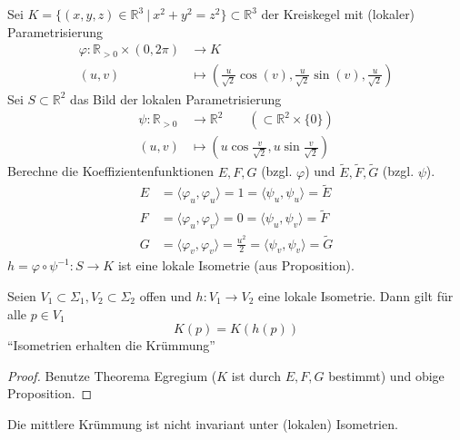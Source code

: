 \documentclass[../main.tex]{subfiles}
\begin{document}
\begin{example}[Kreiskegel]
    Sei $K=\{(x,y,z)\in \mathbb{R}^3 \ | \ x^2 + y^2 = z^2 \} \subset \mathbb{R}^3$ der Kreiskegel
    mit (lokaler) Parametrisierung
    \begin{align*}
        \varphi : \mathbb{R}_{>0} \times (0, 2\pi) &\to K \\
        (u,v) &\mapsto (\frac{u}{\sqrt{2}}\cos(v), \frac{u}{\sqrt{2}}\sin(v), \frac{u}{\sqrt{2}})
    \end{align*}
    Sei $S\subset \mathbb{R}^2$ das Bild der lokalen Parametrisierung
    \begin{align*}
        \psi : \mathbb{R}_{>0} &\to \mathbb{R}^2 \qquad (\subset \mathbb{R}^2 \times \{0\}) \\
        (u,v) &\mapsto (u\cos \frac{v}{\sqrt{2}}, u\sin \frac{v}{\sqrt{2}})
    \end{align*}
    Berechne die Koeffizientenfunktionen $E,F,G$ (bzgl. $\varphi$) und $\tilde{E}, \tilde{F}, \tilde{G}$ (bzgl. $\psi$).
    \begin{align*}
        E &= \langle \varphi _u, \varphi _u \rangle = 1 = \langle \psi _u, \psi _u \rangle = \tilde{E} \\
        F &= \langle \varphi _u, \varphi _v \rangle = 0 = \langle \psi _u, \psi _v \rangle = \tilde{F} \\
        G &= \langle \varphi _v, \varphi _v \rangle = \frac{u^2}{2} = \langle \psi _v, \psi _v \rangle = \tilde{G} 
    \end{align*}
    $h = \varphi \circ \psi ^{-1} : S \to K $ ist eine lokale Isometrie (aus Proposition).
\end{example}

\begin{corollary}
    Seien $V_1 \subset \Sigma_1, V_2 \subset \Sigma _2$ offen und
    $h: V_1 \to V_2$ eine lokale Isometrie. Dann gilt für alle $p\in V_1$
    $$K(p)=K(h(p))$$ ``Isometrien erhalten die Krümmung''
\end{corollary}
\begin{proof}
    Benutze Theorema Egregium ($K$ ist durch $E,F,G$ bestimmt) und obige Proposition.
\end{proof}

\begin{remark}
    Die mittlere Krümmung ist nicht invariant unter (lokalen) Isometrien.
\end{remark}
\begin{figure}[H]
    \centering
    \def\svgwidth{15em}
    
\end{figure}
\end{document}
